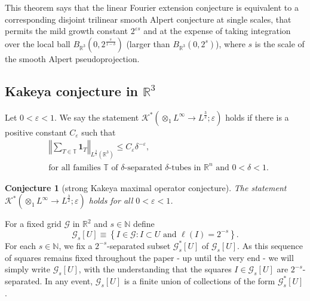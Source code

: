 \documentclass{amsart}%
\theoremstyle{plain}
\newtheorem{conjecture}[theorem]{Conjecture}
\numberwithin{equation}{section}
\begin{document}
This theorem says that the linear Fourier extension conjecture is equivalent
to a corresponding disjoint trilinear smooth Alpert conjecture at single
scales, that permits the mild growth constant $2^{\varepsilon s}$ and at the
expense of taking integration over the local ball $B_{\mathbb{R}^{3}}\left(
0,2^{\frac{s}{1-\delta}}\right)  $ (larger than $B_{\mathbb{R}^{3}}\left(
0,2^{s}\right)  $), where $s$ is the scale of the smooth Alpert pseudoprojection.

\subsection{Kakeya conjecture in $\mathbb{R}^{3}$}

Let $0<\varepsilon<1$. We say the statement $\mathcal{K}^{\ast}\left(
\otimes_{1}L^{\infty}\rightarrow L^{\frac{3}{2}};\varepsilon\right)  $ holds
if there is a positive constant $C_{\varepsilon}$ such that%
\begin{align}
& \left\Vert \sum_{T\in\mathbb{T}}\mathbf{1}_{T}\right\Vert _{L^{\frac{3}{2}%
}\left(  \mathbb{R}^{3}\right)  }\leq C_{\varepsilon}\delta^{-\varepsilon
},\label{Kak dual}\\
& \text{for all families }\mathbb{T}\text{ of }\delta\text{-separated }%
\delta\text{-tubes in }\mathbb{R}^{n}\text{ and }0<\delta<1.\nonumber
\end{align}


\begin{conjecture}
[strong Kakeya maximal operator conjecture]\label{linear Kakeya}The statement
$\mathcal{K}^{\ast}\left(  \otimes_{1}L^{\infty}\rightarrow L^{\frac{3}{2}%
};\varepsilon\right)  $ holds for all $0<\varepsilon<1$.
\end{conjecture}

For a fixed grid $\mathcal{G}$ in $\mathbb{R}^{2}$ and $s\in\mathbb{N}$ define%
\[
\mathcal{G}_{s}\left[  U\right]  \equiv\left\{  I\in\mathcal{G}:I\subset
U\text{ and }\ell\left(  I\right)  =2^{-s}\right\}  .
\]
For each $s\in\mathbb{N}$, we fix a $2^{-s}$-separated subset $\mathcal{G}%
_{s}^{\ast}\left[  U\right]  $ of $\mathcal{G}_{s}\left[  U\right]  $. As this
sequence of squares remains fixed throughout the paper - up until the very end
- we will simply write $\mathcal{G}_{s}\left[  U\right]  $, with the
understanding that the squares $I\in\mathcal{G}_{s}\left[  U\right]  $ are
$2^{-s}$-separated. In any event, $\mathcal{G}_{s}\left[  U\right]  $ is a
finite union of collections of the form $\mathcal{G}_{s}^{\ast}\left[
U\right]  $.
\end{document}
